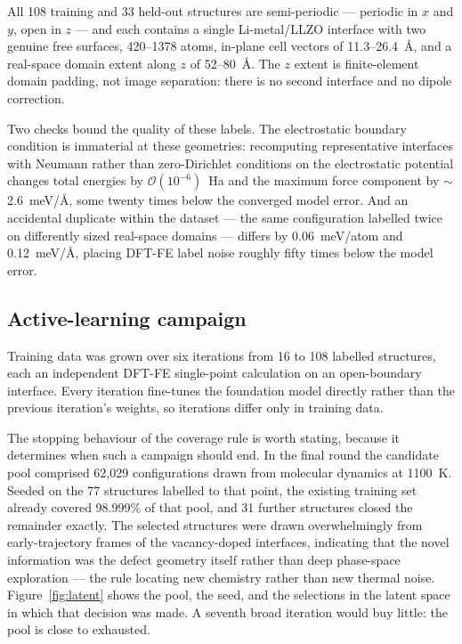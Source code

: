 \documentclass[11pt]{article}
\begin{document}
All 108 training and 33 held-out structures are semi-periodic --- periodic in
$x$ and $y$, open in $z$ --- and each contains a single Li-metal/LLZO interface
with two genuine free surfaces, 420--1378 atoms, in-plane cell vectors of
11.3--26.4~\AA, and a real-space domain extent along $z$ of 52--80~\AA. The $z$
extent is finite-element domain padding, not image separation: there is no
second interface and no dipole correction.

Two checks bound the quality of these labels. The electrostatic boundary
condition is immaterial at these geometries: recomputing representative
interfaces with Neumann rather than zero-Dirichlet conditions on the
electrostatic potential changes total energies by $\mathcal{O}(10^{-6})$~Ha and
the maximum force component by $\sim$2.6~meV/\AA, some twenty times below the
converged model error. And an accidental duplicate within the dataset --- the
same configuration labelled twice on differently sized real-space domains ---
differs by 0.06~meV/atom and 0.12~meV/\AA, placing DFT-FE label noise roughly
fifty times below the model error.

\subsection{Active-learning campaign}

Training data was grown over six iterations from 16 to 108 labelled
structures, each an independent DFT-FE single-point calculation on an
open-boundary interface. Every iteration fine-tunes the foundation model
directly rather than the previous iteration's weights, so iterations differ
only in training data.

The stopping behaviour of the coverage rule is worth stating, because it
determines when such a campaign should end. In the final round the candidate
pool comprised 62{,}029 configurations drawn from molecular dynamics at 1100~K.
Seeded on the 77 structures labelled to that point, the existing training set
already covered 98.999\% of that pool, and 31 further structures closed the
remainder exactly. The selected structures were drawn overwhelmingly from
early-trajectory frames of the vacancy-doped interfaces, indicating that the
novel information was the defect geometry itself rather than deep phase-space
exploration --- the rule locating new chemistry rather than new thermal noise.
Figure~\ref{fig:latent} shows the pool, the seed, and the selections in the
latent space in which that decision was made. A seventh broad iteration would
buy little: the pool is close to exhausted.
\end{document}
